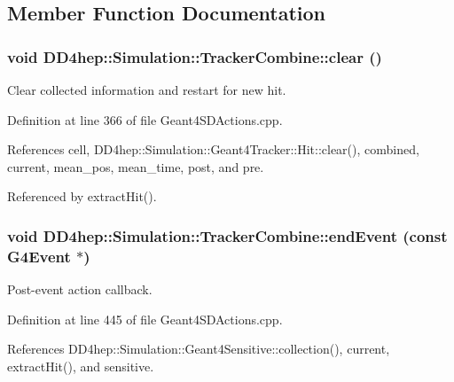\subsection{Member Function Documentation}
\hypertarget{struct_d_d4hep_1_1_simulation_1_1_tracker_combine_a7b178cd57d961437d3cfabb65d9c2d09}{
\subsubsection[{clear}]{\setlength{\rightskip}{0pt plus 5cm}void DD4hep::Simulation::TrackerCombine::clear ()}}
\label{struct_d_d4hep_1_1_simulation_1_1_tracker_combine_a7b178cd57d961437d3cfabb65d9c2d09}


Clear collected information and restart for new hit. 

Definition at line 366 of file Geant4SDActions.cpp.

References cell, DD4hep::Simulation::Geant4Tracker::Hit::clear(), combined, current, mean\_\-pos, mean\_\-time, post, and pre.

Referenced by extractHit().\hypertarget{struct_d_d4hep_1_1_simulation_1_1_tracker_combine_a03b50811a7b164514baebc2f252fba62}{
\subsubsection[{endEvent}]{\setlength{\rightskip}{0pt plus 5cm}void DD4hep::Simulation::TrackerCombine::endEvent (const G4Event $\ast$)}}
\label{struct_d_d4hep_1_1_simulation_1_1_tracker_combine_a03b50811a7b164514baebc2f252fba62}


Post-\/event action callback. 

Definition at line 445 of file Geant4SDActions.cpp.

References DD4hep::Simulation::Geant4Sensitive::collection(), current, extractHit(), and sensitive.

